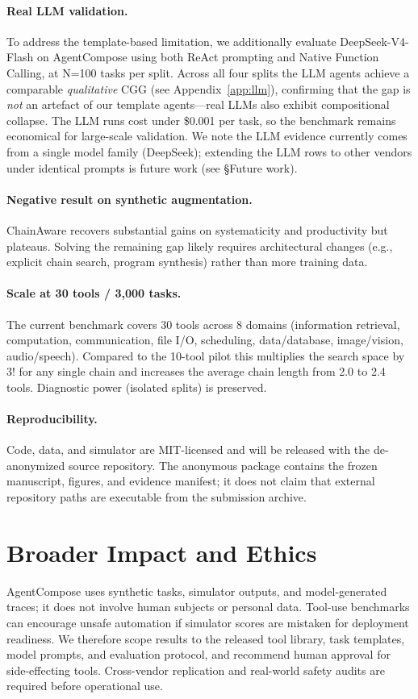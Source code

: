 ﻿\documentclass{article}
\begin{document}
\paragraph{Real LLM validation.} To address the template-based limitation, we additionally evaluate DeepSeek-V4-Flash on AgentCompose using both ReAct prompting and Native Function Calling, at N=100 tasks per split. Across all four splits the LLM agents achieve a comparable \emph{qualitative} CGG (see Appendix~\ref{app:llm}), confirming that the gap is \emph{not} an artefact of our template agents---real LLMs also exhibit compositional collapse. The LLM runs cost under \$0.001 per task, so the benchmark remains economical for large-scale validation. We note the LLM evidence currently comes from a single model family (DeepSeek); extending the LLM rows to other vendors under identical prompts is future work (see \S Future work).

\paragraph{Negative result on synthetic augmentation.} ChainAware recovers substantial gains on systematicity and productivity but plateaus. Solving the remaining gap likely requires architectural changes (e.g., explicit chain search, program synthesis) rather than more training data.

\paragraph{Scale at 30 tools / 3{,}000 tasks.} The current benchmark covers 30 tools across 8 domains (information retrieval, computation, communication, file I/O, scheduling, data/database, image/vision, audio/speech). Compared to the 10-tool pilot this multiplies the search space by $3!$ for any single chain and increases the average chain length from 2.0 to 2.4 tools. Diagnostic power (isolated splits) is preserved.

\paragraph{Reproducibility.} Code, data, and simulator are MIT-licensed and will be released with the de-anonymized source repository. The anonymous package contains the frozen manuscript, figures, and evidence manifest; it does not claim that external repository paths are executable from the submission archive.

\section{Broader Impact and Ethics}
AgentCompose uses synthetic tasks, simulator outputs, and model-generated traces; it does not involve human subjects or personal data. Tool-use benchmarks can encourage unsafe automation if simulator scores are mistaken for deployment readiness. We therefore scope results to the released tool library, task templates, model prompts, and evaluation protocol, and recommend human approval for side-effecting tools. Cross-vendor replication and real-world safety audits are required before operational use.
\end{document}
